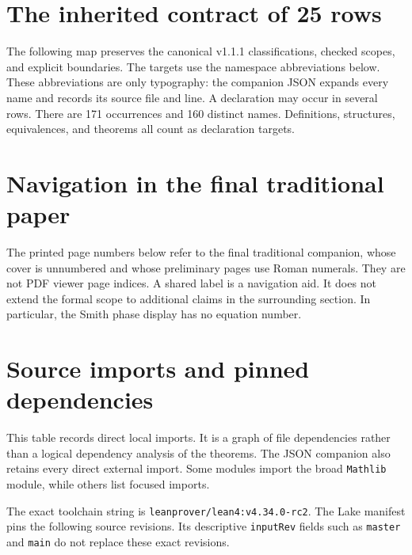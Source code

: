 \documentclass[11pt,a4paper]{article}
\newcommand{\code}[1]{\nolinkurl{#1}}
\begin{document}
\KomorebiCover
{}


\tableofcontents
\clearpage
{}

\clearpage

\clearpage






\clearpage
\section{The inherited contract of 25 rows}\label{sec:map}
The following map preserves the canonical v1.1.1 classifications, checked scopes, and explicit boundaries. The targets use the namespace abbreviations below. These abbreviations are only typography: the companion JSON expands every name and records its source file and line. A declaration may occur in several rows. There are 171 occurrences and 160 distinct names. Definitions, structures, equivalences, and theorems all count as declaration targets.


\clearpage
\appendix
\section{Navigation in the final traditional paper}\label{app:crosswalk}
The printed page numbers below refer to the final traditional companion, whose cover is unnumbered and whose preliminary pages use Roman numerals. They are not PDF viewer page indices. A shared label is a navigation aid. It does not extend the formal scope to additional claims in the surrounding section. In particular, the Smith phase display has no equation number.

\section{Source imports and pinned dependencies}\label{app:imports}
This table records direct local imports. It is a graph of file dependencies rather than a logical dependency analysis of the theorems. The JSON companion also retains every direct external import. Some modules import the broad \code{Mathlib} module, while others list focused imports.

The exact toolchain string is \code{leanprover/lean4:v4.34.0-rc2}. The Lake manifest pins the following source revisions. Its descriptive \code{inputRev} fields such as \code{master} and \code{main} do not replace these exact revisions.

\end{document}
